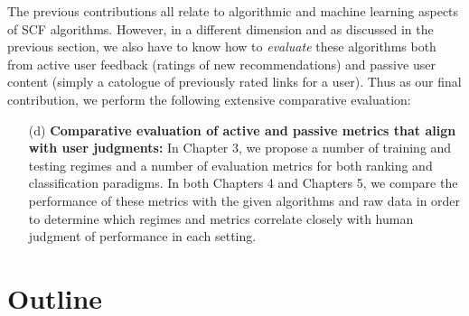 The previous contributions all relate to algorithmic and machine
learning aspects of SCF algorithms.  However, in a different dimension
and as discussed in the previous section, we also have to know how to
\emph{evaluate} these algorithms both from active user feedback
(ratings of new recommendations) and passive user content (simply a
catologue of previously rated links for a user).  Thus as our final
contribution, we perform the following extensive comparative
evaluation:
\begin{enumerate}
\item[(d)] {\bf Comparative evaluation of active and passive metrics 
that align with user judgments:} 
In Chapter 3, we
propose a number of training and testing regimes and a number of
evaluation metrics for both ranking and classification paradigms.  In
both Chapters 4 and Chapters 5, we compare
the performance of these metrics with the given algorithms and raw
data in order to determine which regimes and metrics correlate closely
with human judgment of performance in each setting.
\end{enumerate}

\section{Outline}


